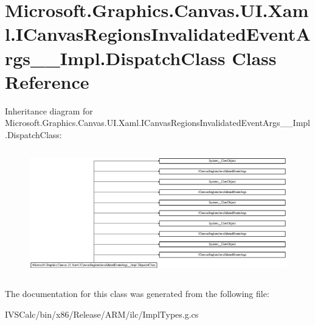 \hypertarget{class_microsoft_1_1_graphics_1_1_canvas_1_1_u_i_1_1_xaml_1_1_i_canvas_regions_invalidated_event_1adf23e0616dc67e0382bd71fdade108}{}\section{Microsoft.\+Graphics.\+Canvas.\+U\+I.\+Xaml.\+I\+Canvas\+Regions\+Invalidated\+Event\+Args\+\_\+\+\_\+\+Impl.\+Dispatch\+Class Class Reference}
\label{class_microsoft_1_1_graphics_1_1_canvas_1_1_u_i_1_1_xaml_1_1_i_canvas_regions_invalidated_event_1adf23e0616dc67e0382bd71fdade108}
Inheritance diagram for Microsoft.\+Graphics.\+Canvas.\+U\+I.\+Xaml.\+I\+Canvas\+Regions\+Invalidated\+Event\+Args\+\_\+\+\_\+\+Impl.\+Dispatch\+Class\+:\begin{figure}[H]
\begin{center}
\leavevmode
\includegraphics[height=5.529623cm]{class_microsoft_1_1_graphics_1_1_canvas_1_1_u_i_1_1_xaml_1_1_i_canvas_regions_invalidated_event_1adf23e0616dc67e0382bd71fdade108}
\end{center}
\end{figure}


The documentation for this class was generated from the following file\+:\begin{DoxyCompactItemize}
\item 
I\+V\+S\+Calc/bin/x86/\+Release/\+A\+R\+M/ilc/Impl\+Types.\+g.\+cs\end{DoxyCompactItemize}
